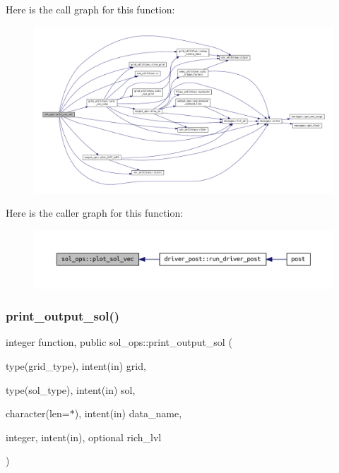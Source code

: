 Here is the call graph for this function\+:
\nopagebreak
\begin{figure}[H]
\begin{center}
\leavevmode
\includegraphics[width=350pt]{namespacesol__ops_ae14af60a6f8f77e7dde1e93dbaa7e6d0_cgraph}
\end{center}
\end{figure}
Here is the caller graph for this function\+:
\nopagebreak
\begin{figure}[H]
\begin{center}
\leavevmode
\includegraphics[width=350pt]{namespacesol__ops_ae14af60a6f8f77e7dde1e93dbaa7e6d0_icgraph}
\end{center}
\end{figure}
\mbox{\label{namespacesol__ops_abd5b3b2d7008f482dd38f898a3300357}} 
\subsubsection{\texorpdfstring{print\+\_\+output\+\_\+sol()}{print\_output\_sol()}}
{\footnotesize\ttfamily integer function, public sol\+\_\+ops\+::print\+\_\+output\+\_\+sol (\begin{DoxyParamCaption}\item[{type(grid\+\_\+type), intent(in)}]{grid,  }\item[{type(sol\+\_\+type), intent(in)}]{sol,  }\item[{character(len=$\ast$), intent(in)}]{data\+\_\+name,  }\item[{integer, intent(in), optional}]{rich\+\_\+lvl }\end{DoxyParamCaption})}



